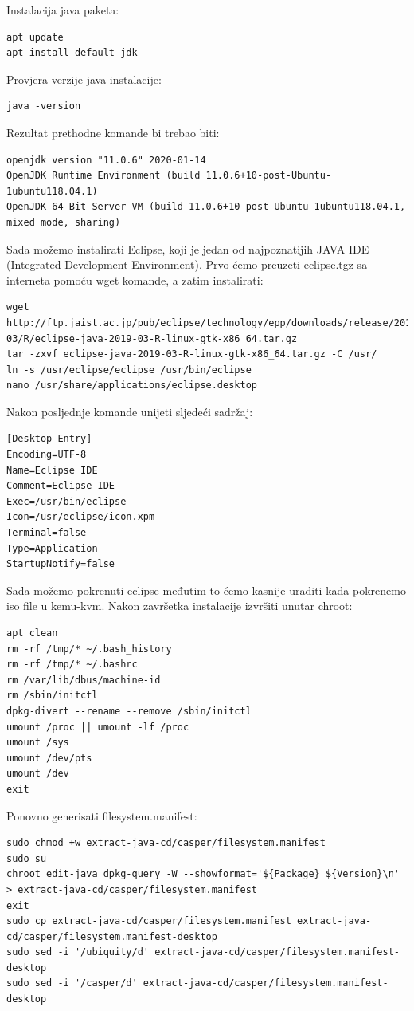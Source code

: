 \documentclass[12pt,vi]{mitthesis}
\begin{document}
\noindent
Instalacija java paketa:
\begin{lstlisting}[style=BashInputStyle]
apt update
apt install default-jdk
\end{lstlisting}
Provjera verzije java instalacije:
\begin{lstlisting}[style=BashInputStyle]
java -version
\end{lstlisting}
Rezultat prethodne komande bi trebao biti:
\begin{lstlisting}[style=BashInputStyle]
openjdk version "11.0.6" 2020-01-14
OpenJDK Runtime Environment (build 11.0.6+10-post-Ubuntu-1ubuntu118.04.1)
OpenJDK 64-Bit Server VM (build 11.0.6+10-post-Ubuntu-1ubuntu118.04.1, mixed mode, sharing)
\end{lstlisting}
Sada možemo instalirati Eclipse, koji je jedan od najpoznatijih JAVA IDE (Integrated Development Environment). Prvo ćemo preuzeti eclipse.tgz sa interneta pomoću wget komande, a zatim instalirati:
\begin{lstlisting}[style=BashInputStyle]
wget http://ftp.jaist.ac.jp/pub/eclipse/technology/epp/downloads/release/2019-03/R/eclipse-java-2019-03-R-linux-gtk-x86_64.tar.gz
tar -zxvf eclipse-java-2019-03-R-linux-gtk-x86_64.tar.gz -C /usr/
ln -s /usr/eclipse/eclipse /usr/bin/eclipse
nano /usr/share/applications/eclipse.desktop
\end{lstlisting}
Nakon posljednje komande unijeti sljedeći sadržaj:
\begin{lstlisting}[style=BashInputStyle]
[Desktop Entry]
Encoding=UTF-8
Name=Eclipse IDE
Comment=Eclipse IDE
Exec=/usr/bin/eclipse
Icon=/usr/eclipse/icon.xpm
Terminal=false
Type=Application
StartupNotify=false
\end{lstlisting}
Sada možemo pokrenuti eclipse međutim to ćemo kasnije uraditi kada pokrenemo iso file u kemu-kvm.
\noindent
Nakon završetka instalacije izvršiti unutar chroot:
\begin{lstlisting}[style=BashInputStyle]
apt clean
rm -rf /tmp/* ~/.bash_history
rm -rf /tmp/* ~/.bashrc
rm /var/lib/dbus/machine-id
rm /sbin/initctl
dpkg-divert --rename --remove /sbin/initctl
umount /proc || umount -lf /proc
umount /sys
umount /dev/pts
umount /dev
exit
\end{lstlisting}

\noindent
Ponovno generisati filesystem.manifest:
\begin{lstlisting}[style=BashInputStyle]
sudo chmod +w extract-java-cd/casper/filesystem.manifest
sudo su
chroot edit-java dpkg-query -W --showformat='${Package} ${Version}\n' > extract-java-cd/casper/filesystem.manifest
exit
sudo cp extract-java-cd/casper/filesystem.manifest extract-java-cd/casper/filesystem.manifest-desktop
sudo sed -i '/ubiquity/d' extract-java-cd/casper/filesystem.manifest-desktop
sudo sed -i '/casper/d' extract-java-cd/casper/filesystem.manifest-desktop
\end{lstlisting}
\end{document}
